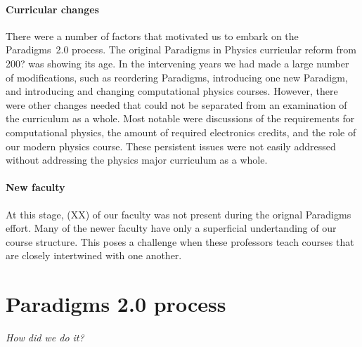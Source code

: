 \documentclass[english,aps,pra,reprint,noshowpacs,superscriptaddress]{revtex4-1}
\begin{document}
\paragraph{Curricular changes}
There were a number of factors that motivated us to embark on the
Paradigms~2.0 process.  The original Paradigms in Physics curricular
reform from 200? was showing its age.  In the intervening years we had
made a large number of modifications, such as reordering Paradigms,
introducing one new Paradigm, and introducing and changing
computational physics courses.  However, there were other changes
needed that could not be separated from an examination of the
curriculum as a whole.  Most notable were discussions of the
requirements for computational physics, the amount of required
electronics credits, and the role of our modern physics course.  These
persistent issues were not easily addressed without addressing the
physics major curriculum as a whole.

\paragraph{New faculty}
At this stage, (XX) of our faculty was not present during the orignal
Paradigms effort.  Many of the newer faculty have only a superficial
undertanding of our course structure.  This poses a challenge when
these professors teach courses that are closely intertwined with one
another.

\section{Paradigms 2.0 process}
\emph{How did we do it?}

\newcommand\mathcourse[2]{\emph{#1}}
\newcommand\noted[2]{\textbf{#1} (#2)}
\newcommand\paradigm[1]{{\sc #1} (3)}
\newcommand\capstone[1]{#1 (3)}
\newcommand\onecredit[1]{#1 (1)}
\newcommand\threecredit[1]{#1 (3)}
\newcommand\fourcredit[1]{#1 (4)}
\end{document}
